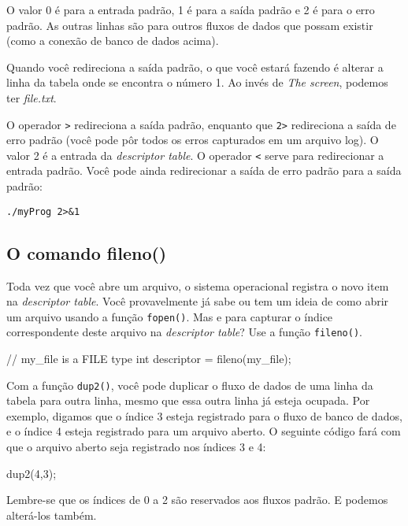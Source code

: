 \documentclass[12pt, a4paper]{article}
\begin{document}
O valor 0 é para a entrada padrão, 1 é para a saída padrão e 2 é para o erro padrão. As outras linhas são para outros fluxos de dados que possam existir (como a conexão de banco de dados acima).

Quando você redireciona a saída padrão, o que você estará fazendo é alterar a linha da tabela onde se encontra o número 1. Ao invés de \textit{The screen}, podemos ter \textit{file.txt}.

O operador \verb|>| redireciona a saída padrão, enquanto que \verb|2>| redireciona a saída de erro padrão (você pode pôr todos os erros capturados em um arquivo log). O valor 2 é a entrada da \textit{descriptor table}. O operador \verb|<| serve para redirecionar a entrada padrão. Você pode ainda redirecionar a saída de erro padrão para a saída padrão:

\begin{verbatim}
./myProg 2>&1
\end{verbatim}

\subsection{O comando fileno()}

Toda vez que você abre um arquivo, o sistema operacional registra o novo item na \textit{descriptor table}. Você provavelmente já sabe ou tem um ideia de como abrir um arquivo usando a função \verb|fopen()|. Mas e para capturar o índice correspondente deste arquivo na \textit{descriptor table}? Use a função \verb|fileno()|.\\

\begin{ccode}
// my_file is a FILE type
int descriptor = fileno(my_file);
\end{ccode}

Com a função \verb|dup2()|, você pode duplicar o fluxo de dados de uma linha da tabela para outra linha, mesmo que essa outra linha já esteja ocupada. Por exemplo, digamos que o índice 3 esteja registrado para o fluxo de banco de dados, e o índice 4 esteja registrado para um arquivo aberto. O seguinte código fará com que o arquivo aberto seja registrado nos índices 3 e 4:\\

\begin{ccode}
dup2(4,3);
\end{ccode}

Lembre-se que os índices de 0 a 2 são reservados aos fluxos padrão. E podemos alterá-los também.
\end{document}
